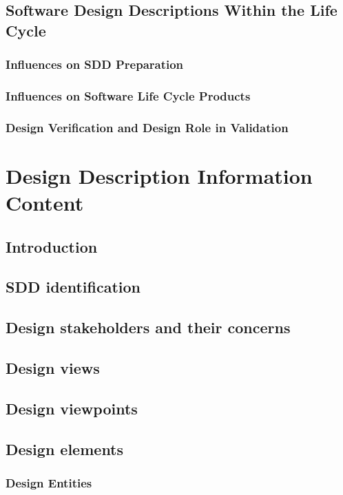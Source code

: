 \documentclass[letterpaper,10pt,titlepage,draftclsnofoot,onecolumn,onesided] {IEEEtran}
\begin{document}
\subsection{Software Design Descriptions Within the Life Cycle}
\subsubsection{Influences on SDD Preparation}
\subsubsection{Influences on Software Life Cycle Products}
\subsubsection{Design Verification and Design Role in Validation}

\section{Design Description Information Content}

\subsection{Introduction}

\subsection{SDD identification}

\subsection{Design stakeholders and their concerns}

\subsection{Design views}

\subsection{Design viewpoints}

\subsection{Design elements}
\subsubsection{Design Entities}
\end{document}
